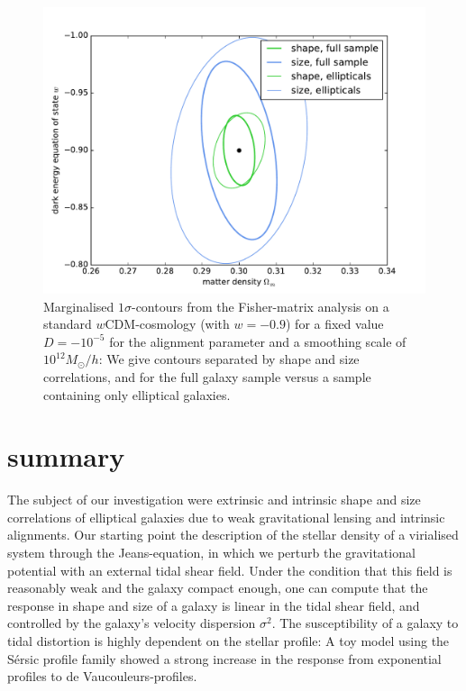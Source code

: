 \documentclass[a4paper,fleqn,usenatbib]{mnras}
\begin{document}
\begin{figure}
\centering
\includegraphics[scale=0.45]{./figures/fisher.pdf}
\caption{Marginalised $1\sigma$-contours from the Fisher-matrix analysis on a standard $w$CDM-cosmology (with $w=-0.9$) for a fixed value $D=-10^{-5}$ for the alignment parameter and a smoothing scale of $10^{12}M_\odot/h$: We give contours separated by shape and size correlations, and for the full galaxy sample versus a sample containing only elliptical galaxies.}
\label{fig:fisher}
\end{figure}


\section{summary}\label{sect_summary}
The subject of our investigation were extrinsic and intrinsic shape and size correlations of elliptical galaxies due to weak gravitational lensing and intrinsic alignments. Our starting point the description of the stellar density of a virialised system through the Jeans-equation, in which we perturb the gravitational potential with an external tidal shear field. Under the condition that this field is reasonably weak and the galaxy compact enough, one can compute that the response in shape and size of a galaxy is linear in the tidal shear field, and controlled by the galaxy's velocity dispersion $\sigma^2$. The susceptibility of a galaxy to tidal distortion is highly dependent on the stellar profile: A toy model using the S{\'e}rsic profile family showed a strong increase in the response from exponential profiles to de Vaucouleurs-profiles.
\end{document}
